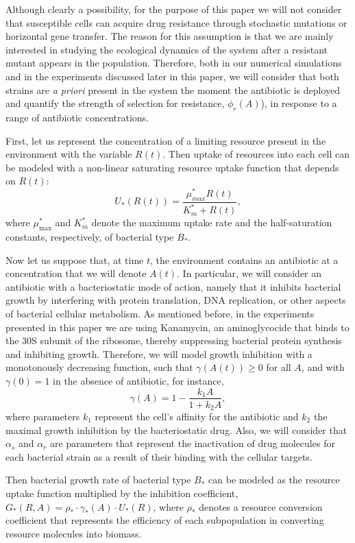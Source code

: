 \documentclass[fleqn,12pt]{wlscirep}
\begin{document}
Although clearly a possibility, for the purpose of this paper we will not consider that susceptible cells can acquire drug resistance through stochastic mutations or horizontal gene transfer.  The reason for this assumption is that we are mainly interested in studying the ecological dynamics of the system after a resistant mutant appears in the population. Therefore, both in our numerical simulations and in the experiments discussed later in this paper, we will consider that both strains are {\em a priori} present in the system the moment the antibiotic is deployed and quantify the strength of selection for resistance, $\phi_r(A)$), in response to a range of antibiotic concentrations.  

First, let us represent the concentration of a limiting resource present in the environment with the variable $R(t)$. Then uptake of resources into each cell can be modeled with a non-linear saturating resource uptake function that depends on $R(t)$:
\begin{equation}
 U_*(R(t))= \frac{\mu^*_{max}R(t)}{K_m^*+R(t)},
\end{equation}
where $\mu^*_{\max}$ and $K_m^*$ denote the maximum uptake rate and the half-saturation constants, respectively, of bacterial type $B_*$.

Now let us suppose that, at time $t$, the environment contains an antibiotic at a concentration that we will denote $A(t)$. In particular, we will consider an antibiotic with a bacteriostatic mode of action, namely that it inhibits bacterial growth by interfering with protein translation, DNA replication, or other aspects of bacterial cellular metabolism. As mentioned before, in the experiments presented in this paper we are using Kanamycin, an aminoglycocide that binds to the 30S subunit of the ribosome, thereby suppressing bacterial protein synthesis and inhibiting growth.  Therefore, we will model growth inhibition with a monotonously decreasing function, such that $\gamma(A(t)) \geq 0$ for all $A$, and with $\gamma(0)=1$ in the absence of antibiotic, for instance,
\[
\gamma(A)=1-\frac{k_1 A}{1+k_2 A},
\]
where parameters $k_1$ represent the cell's affinity for the antibiotic and $k_2$ the maximal growth inhibition by the bacteriostatic drug\cite{PenaMiller2011}. Also, we will consider that $\alpha_s$ and $\alpha_r$ are parameters that represent the inactivation of drug molecules for each bacterial strain as a result of their binding with the cellular targets.

Then bacterial growth rate of bacterial type $B_*$ can be modeled as the resource uptake function multiplied by the inhibition coefficient, $G_*(R,A) =\rho_* \cdot \gamma_*(A) \cdot U_*(R)$, where $\rho_*$ denotes a resource conversion coefficient that represents the efficiency of each subpopulation in converting resource molecules into biomass.
\end{document}
